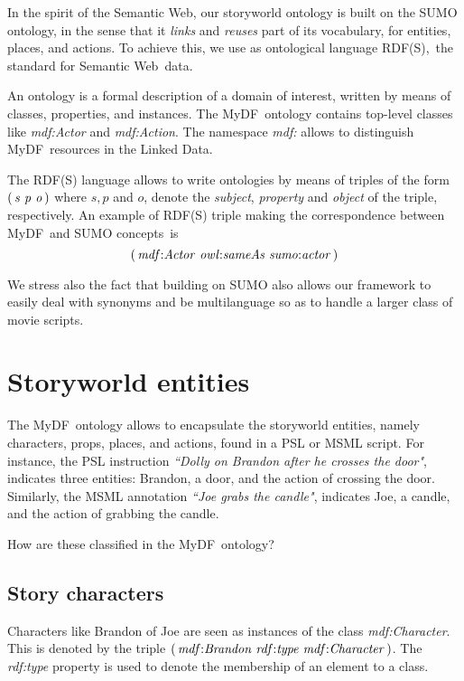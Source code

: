 \documentclass[a4paper,UKenglish]{oasics}
\newcommand{\mydf}{MyDF}
\newcommand{\ns}{mdf{:}}
\newcommand{\class}[1]{{\it#1}}
\newcommand{\triple}[3]{{\it(\,#1\,\,#2\,\,#3\,)}}
\begin{document}
\smallskip
In the spirit of the Semantic Web, our storyworld ontology is built on the SUMO ontology, in the sense that it \emph{links} and \emph{reuses} part of its vocabulary,  for entities, places, and actions.
To achieve this, we use as ontological language RDF(S),~the standard for Semantic Web~data.

\smallskip
An ontology is a formal description of a domain of interest, written by means  of classes, properties, and instances.
The \mydf\ ontology contains top-level classes like 
\class{\ns Actor} and 
\class{\ns Action}. 
The namespace \emph{\ns} allows to distinguish \mydf\ resources in the Linked Data.

\smallskip
The RDF(S) language allows to write ontologies by means of triples of the form $\triple{s}{p}{o}$ where $s,p$ and $o$, denote the \emph{subject}, \emph{property} and \emph{object} of the triple, respectively. An example of RDF(S) triple making the correspondence between \mydf\ and SUMO concepts~is 
$$\triple{\ns Actor}{owl{:}sameAs}{sumo{:}actor}$$

We stress also the fact that building on SUMO also allows our framework to easily deal with synonyms and be multilanguage so as to handle a larger class of movie scripts.


\section{Storyworld entities}
The \mydf\ ontology allows to encapsulate the storyworld entities, namely characters, props, places, and actions, found in a PSL or MSML script. 
For instance, the PSL instruction 
\emph{``Dolly on Brandon after he crosses the door"}, indicates three entities: Brandon, a door, and the action of crossing the door. 
Similarly, the MSML annotation 
\emph{``Joe grabs the candle"}, indicates Joe, a candle, and the action of grabbing the candle.

\smallskip
How are these classified in the \mydf\ ontology?

\subsection{Story characters}
Characters like Brandon of Joe are seen as instances of the class \class{\ns Character}. 
This is denoted by the triple  $\triple{\ns Brandon}{rdf{:}type}{\ns Character}$. 
The \emph{rdf{:}type} property is used to denote the membership of an element to a class.
\end{document}
